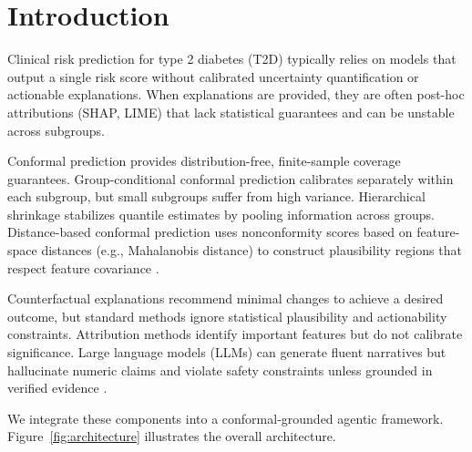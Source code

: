 \documentclass[11pt,a4paper]{article}
\theoremstyle{plain}
\begin{document}
\section{Introduction}
\label{sec:introduction}

Clinical risk prediction for type 2 diabetes (T2D) typically relies on models that output a single risk score without calibrated uncertainty quantification or actionable explanations. When explanations are provided, they are often post-hoc attributions (SHAP, LIME) that lack statistical guarantees and can be unstable across subgroups.

Conformal prediction \citep{vovk2005algorithmic, shafer2008tutorial, angelopoulos2021gentle} provides distribution-free, finite-sample coverage guarantees. Group-conditional conformal prediction \citep{lei2018distribution, romano2019conformalized, melki2023group} calibrates separately within each subgroup, but small subgroups suffer from high variance. Hierarchical shrinkage \citep{dunn2023distribution} stabilizes quantile estimates by pooling information across groups. Distance-based conformal prediction uses nonconformity scores based on feature-space distances (e.g., Mahalanobis distance) to construct plausibility regions that respect feature covariance \citep{vovk2005algorithmic, shafer2008tutorial, lei2018distribution}.

Counterfactual explanations \citep{wachter2017counterfactual} recommend minimal changes to achieve a desired outcome, but standard methods ignore statistical plausibility and actionability constraints. Attribution methods \citep{lundberg2017unified} identify important features but do not calibrate significance. Large language models (LLMs) can generate fluent narratives but hallucinate numeric claims and violate safety constraints unless grounded in verified evidence \citep{yao2023react, schick2023toolformer}.

We integrate these components into a conformal-grounded agentic framework. Figure~\ref{fig:architecture} illustrates the overall architecture.
\end{document}
